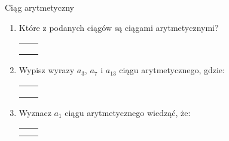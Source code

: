 \documentclass[12pt,a4paper]{article}
\begin{document}
	\begin{center}
		\LARGE Ciąg arytmetyczny
	\end{center}
	\vspace{1cm}
	
	
	\begin{enumerate}[1.]	
		\item Które z podanych ciągów są ciągami arytmetycznymi?
		
		
		\begin{enumerate}[a)] \begin{tabular}{p{7cm} p{7cm}} 
				\item $a_n=3n+1$& \vspace{0.4cm} 	\item $a_n=7$ \\
				\item $a_n=5n^2-3$&  	\item $a_n=\sqrt{2}n$ \\
				\item $a_n=\frac{2n+1}{3}$&  	\item $a_n=2n$ \\
		\end{tabular} \end{enumerate}
	
		\item Wypisz wyrazy $a_3$, $a_7$ i $a_{13}$ ciągu arytmetycznego, gdzie: 
		\begin{enumerate}[a)] \begin{tabular}{p{7cm} p{7cm}} 
				\item $a_1=-1 \quad r=3$& \vspace{0.4cm} 	\item $a_1=10 \quad r=-3$ \\
				\item $a_1=2 \quad a_2=5$&  	\item $a_1=0 \quad a_2=4$ \\
				\item $a_1=-1 \quad a_5=7$&  	\item $a_1=5 \quad a_5=3$ \\
		\end{tabular} \end{enumerate}
	
		\item Wyznacz $a_1$ ciągu arytmetycznego wiedząć, że:
		\begin{enumerate}[a)] \begin{tabular}{p{7cm} p{7cm}} 
				\item $a_{22}=-92 \quad r=-3$& \vspace{0.4cm} 	\item $a_7=37 \quad r=6$ \\
				\item $a_{39}15 \quad a_{35}=11$&  	\item $a_{30}=4 \quad a_{20}=3$ \\
		\end{tabular} \end{enumerate}
	

\end{enumerate}
\end{document}
